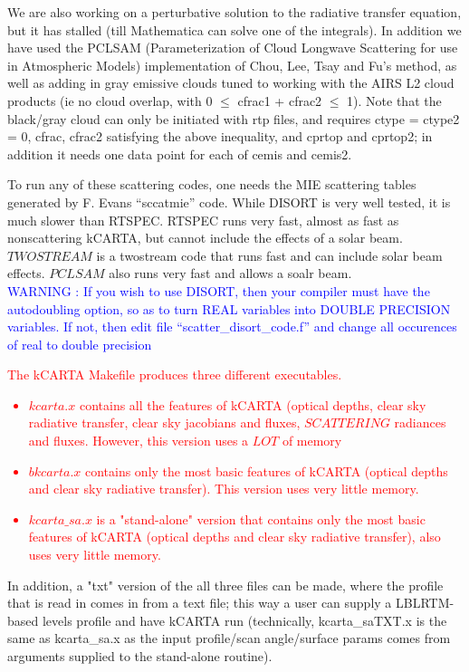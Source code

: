 \documentclass[12pt]{article}
\newcommand{\kc}{\textsf{kCARTA}\xspace}
\begin{document}
We are also working on a perturbative solution to the radiative transfer 
equation, but it has stalled (till Mathematica can solve one of the integrals).
In addition we have used the PCLSAM (Parameterization of Cloud Longwave 
Scattering for use in Atmospheric Models) implementation of Chou, Lee, Tsay 
and Fu's method, as well as adding in gray emissive clouds tuned to working
with the AIRS L2 cloud products (ie no cloud overlap, with 
0 $\le$ cfrac1 + cfrac2 $\le$ 1). Note that the black/gray cloud can only be
initiated with rtp files, and requires ctype = ctype2 = 0, cfrac, cfrac2 satisfying
the above inequality, and cprtop and cprtop2; in addition it needs one data point
for each of cemis and cemis2.

To run any of these scattering  codes, one needs the MIE scattering tables 
generated by F. Evans ``sccatmie'' code. While DISORT is very well tested, it 
is much slower than RTSPEC. RTSPEC runs very fast, almost as fast as 
nonscattering kCARTA, but cannot include the effects of a solar beam. 
$TWOSTREAM$ is a twostream code that runs fast and can include solar beam 
effects. $PCLSAM$ also runs very fast and allows a soalr beam.\\
\textcolor{blue}
{WARNING : If you wish to use DISORT, then your compiler must have the 
autodoubling option, so as to turn REAL variables into DOUBLE PRECISION
variables. If not, then edit file ``scatter\_disort\_code.f'' and change all
occurences of real to double precision}

\textcolor{red}
{The \kc Makefile produces three different executables. 
\begin{itemize}
\item $kcarta.x$ contains all the features of kCARTA (optical depths, clear 
sky radiative transfer, clear sky jacobians and fluxes, $SCATTERING$ 
radiances and fluxes. However, this version uses a $LOT$ of memory
\item $bkcarta.x$ contains only the most basic features of kCARTA 
(optical depths and clear sky radiative transfer). This version uses 
very little memory.
\item $kcarta\_sa.x$ is a "stand-alone" version that contains only the
most basic features of kCARTA (optical depths and clear sky radiative
transfer), also uses very little memory.
\end{itemize}
}

In addition, a "txt" version of the all three files can be made, where the
profile that is read in comes in from a text file; this way a user can supply
a LBLRTM-based levels profile and have kCARTA run (technically, kcarta\_saTXT.x is the
same as kcarta\_sa.x as the input profile/scan angle/surface params comes from arguments
supplied to the stand-alone routine).
\end{document}
